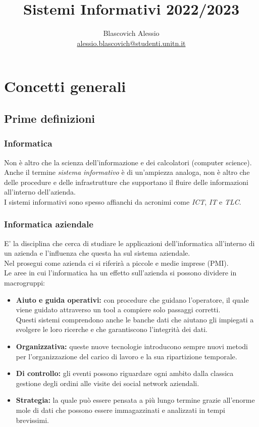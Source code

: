 \documentclass{book}
\title{Sistemi Informativi 2022/2023}
\author{Blascovich Alessio\\
    \href{mailto:alessio.blascovich@studenti.unitn.it}{alessio.blascovich@studenti.unitn.it}}
\date{}
\begin{document}
    \maketitle
    \tableofcontents
    \chapter{Concetti generali}
    \section{Prime definizioni}
    \subsection{Informatica}
    Non è altro che la scienza dell'informazione e dei calcolatori (computer science).\\
    Anche il termine \emph{sistema informativo} è di un'ampiezza analoga, non è altro che delle procedure e delle infrastrutture che supportano il fluire delle informazioni all'interno dell'azienda.\\
    I sistemi informativi sono spesso affianchi da acronimi come \emph{ICT}, \emph{IT} e \emph{TLC}.
    \subsection{Informatica aziendale}
    E' la disciplina che cerca di studiare le applicazioni dell'informatica all'interno di un azienda e l'influenza che questa ha sul sistema aziendale.\\
    Nel prosegui come azienda ci si riferirà a piccole e medie imprese (PMI).\\
    Le aree in cui l'informatica ha un effetto sull'azienda si possono dividere in macrogruppi:
    \begin{itemize}
        \item \textbf{Aiuto e guida operativi:} con procedure che guidano l'operatore, il quale viene guidato   attraverso un tool a compiere solo passaggi corretti.\\
            Questi sistemi comprendono anche le banche dati che aiutano gli impiegati a svolgere le loro ricerche e che garantiscono l'integrità dei dati.
        \item \textbf{Organizzativa:} queste nuove tecnologie introducono sempre nuovi metodi per l'organizzazione del carico di lavoro e la sua ripartizione temporale.
        \item \textbf{Di controllo:} gli eventi possono riguardare ogni ambito dalla classica gestione degli ordini alle visite dei social network aziendali.
        \item \textbf{Strategia:} la quale può essere pensata a più lungo termine grazie all'enorme mole di dati che possono essere immagazzinati e analizzati in tempi brevissimi.
    \end{itemize}
\end{document}
